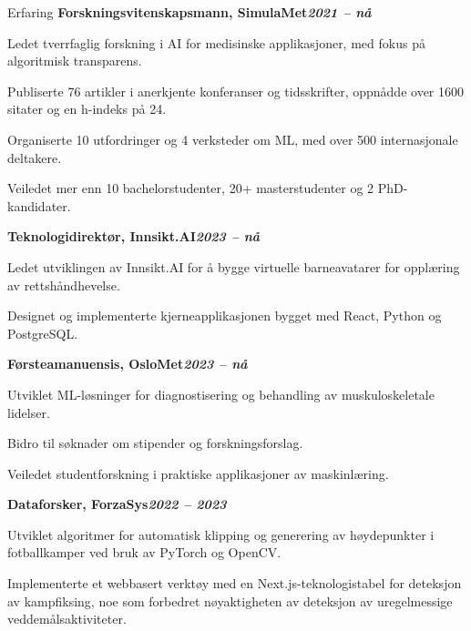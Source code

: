 \begin{rubric}{Erfaring}
%
\entry*[]%
\textbf{Forskningsvitenskapsmann, SimulaMet\hfill\textit{2021 -- nå}} \par
\begin{compactitem}
    \item Ledet tverrfaglig forskning i AI for medisinske applikasjoner, med fokus på algoritmisk transparens.
    \item Publiserte 76 artikler i anerkjente konferanser og tidsskrifter, oppnådde over 1600 sitater og en h-indeks på 24.
    \item Organiserte 10 utfordringer og 4 verksteder om ML, med over 500 internasjonale deltakere.
    \item Veiledet mer enn 10 bachelorstudenter, 20+ masterstudenter og 2 PhD-kandidater.
    \vspace{-12pt}
\end{compactitem}
%
\entry*[]%
\textbf{Teknologidirektør, Innsikt.AI\hfill\textit{2023 -- nå}} \par
\begin{compactitem}
    \item Ledet utviklingen av Innsikt.AI for å bygge virtuelle barneavatarer for opplæring av rettshåndhevelse.
    \item Designet og implementerte kjerneapplikasjonen bygget med React, Python og PostgreSQL.
    \vspace{-12pt}
\end{compactitem}
%
\entry*[]%
\textbf{Førsteamanuensis, OsloMet\hfill\textit{2023 -- nå}} \par
\begin{compactitem}
    \item Utviklet ML-løsninger for diagnostisering og behandling av muskuloskeletale lidelser.
    \item Bidro til søknader om stipender og forskningsforslag.
    \item Veiledet studentforskning i praktiske applikasjoner av maskinlæring.
    \vspace{-12pt}
\end{compactitem}
%
\entry*[]%
\textbf{Dataforsker, ForzaSys\hfill\textit{2022 -- 2023}} \par
\begin{compactitem}
    \item Utviklet algoritmer for automatisk klipping og generering av høydepunkter i fotballkamper ved bruk av PyTorch og OpenCV.
    \item Implementerte et webbasert verktøy med en Next.js-teknologistabel for deteksjon av kampfiksing, noe som forbedret nøyaktigheten av deteksjon av uregelmessige veddemålsaktiviteter.

\end{compactitem}
\end{rubric}
